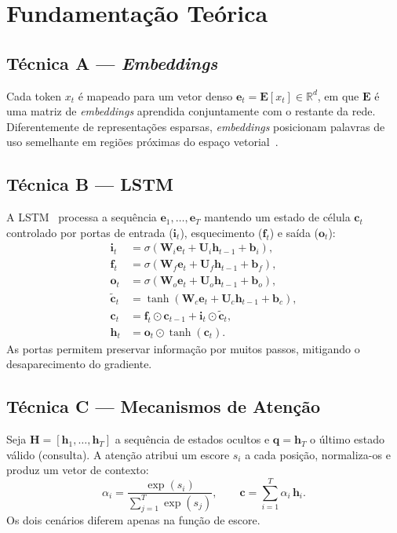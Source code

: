 \documentclass[conference]{IEEEtran}
\begin{document}
\section{Fundamentação Teórica}
\label{sec:fundamentacao}

\subsection{Técnica A --- \textit{Embeddings}}
Cada token $x_t$ é mapeado para um vetor denso $\mathbf{e}_t = \mathbf{E}[x_t] \in \mathbb{R}^{d}$, em que $\mathbf{E}$ é uma matriz de \textit{embeddings} aprendida conjuntamente com o restante da rede. Diferentemente de representações esparsas, \textit{embeddings} posicionam palavras de uso semelhante em regiões próximas do espaço vetorial~\cite{mikolov2013}.

\subsection{Técnica B --- LSTM}
A LSTM~\cite{hochreiter1997} processa a sequência $\mathbf{e}_1,\dots,\mathbf{e}_T$ mantendo um estado de célula $\mathbf{c}_t$ controlado por portas de entrada ($\mathbf{i}_t$), esquecimento ($\mathbf{f}_t$) e saída ($\mathbf{o}_t$):
\begin{align}
\mathbf{i}_t &= \sigma(\mathbf{W}_i\mathbf{e}_t + \mathbf{U}_i\mathbf{h}_{t-1} + \mathbf{b}_i),\\
\mathbf{f}_t &= \sigma(\mathbf{W}_f\mathbf{e}_t + \mathbf{U}_f\mathbf{h}_{t-1} + \mathbf{b}_f),\\
\mathbf{o}_t &= \sigma(\mathbf{W}_o\mathbf{e}_t + \mathbf{U}_o\mathbf{h}_{t-1} + \mathbf{b}_o),\\
\tilde{\mathbf{c}}_t &= \tanh(\mathbf{W}_c\mathbf{e}_t + \mathbf{U}_c\mathbf{h}_{t-1} + \mathbf{b}_c),\\
\mathbf{c}_t &= \mathbf{f}_t \odot \mathbf{c}_{t-1} + \mathbf{i}_t \odot \tilde{\mathbf{c}}_t,\\
\mathbf{h}_t &= \mathbf{o}_t \odot \tanh(\mathbf{c}_t).
\end{align}
As portas permitem preservar informação por muitos passos, mitigando o desaparecimento do gradiente.

\subsection{Técnica C --- Mecanismos de Atenção}
Seja $\mathbf{H} = [\mathbf{h}_1,\dots,\mathbf{h}_T]$ a sequência de estados ocultos e $\mathbf{q} = \mathbf{h}_T$ o último estado válido (consulta). A atenção atribui um escore $s_i$ a cada posição, normaliza-os e produz um vetor de contexto:
\begin{equation}
\alpha_i = \frac{\exp(s_i)}{\sum_{j=1}^{T}\exp(s_j)}, \qquad \mathbf{c} = \sum_{i=1}^{T}\alpha_i\,\mathbf{h}_i .
\end{equation}
Os dois cenários diferem apenas na função de escore.
\end{document}
